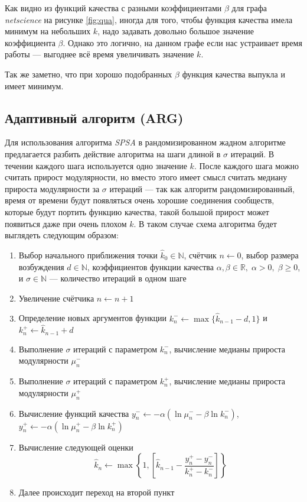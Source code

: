 Как видно из функций качества с разными коэффициентами $\beta$ для графа \emph{netscience} на рисунке \ref{fig:qua}, иногда для того, чтобы функция качества имела минимум на небольших $k$, надо задавать довольно большое значение коэффициента $\beta$. Однако это логично, на данном графе если нас устраивает время работы --- выгоднее всё время увеличивать значение $k$.

Так же заметно, что при хорошо подобранных $\beta$ функция качества выпукла и имеет минимум.



\subsection{Адаптивный алгоритм (ARG)}

Для использования алгоритма \emph{SPSA} в рандомизированном жадном алгоритме предлагается разбить действие алгоритма на шаги длиной в $\sigma$ итераций. В течении каждого шага используется одно значение $k$. После каждого шага можно считать прирост модулярности, но вместо этого имеет смысл считать медиану прироста модулярности за $\sigma$ итераций --- так как алгоритм рандомизированный, время от времени будут появляться очень хорошие соединения сообществ, которые будут портить функцию качества, такой большой прирост может появиться даже при очень плохом $k$. В таком случае схема алгоритма будет выглядеть следующим образом:

\begin{enumerate}
	\item Выбор начального приближения точки $\hat{k}_0 \in \mathbb{N}$, счётчик $n \leftarrow 0$, выбор размера возбуждения $d \in \mathbb{N}$, коэффициентов функции качества $\alpha, \beta \in \mathbb{R},\; \alpha > 0,\;\beta \ge 0$, и $\sigma \in \mathbb{N}$ --- количество итераций в одном шаге
	\item Увеличение счётчика $n \leftarrow n + 1$
	\item Определение новых аргументов функции $k_{n}^{-} \leftarrow \max\{\hat{k}_{n - 1} - d, 1\}$ и $k_{n}^{+} \leftarrow \hat{k}_{n - 1} + d$
	\item Выполнение $\sigma$ итераций с параметром $k_{n}^{-}$, вычисление медианы прироста модулярности $\mu_n^{-}$
	\item Выполнение $\sigma$ итераций с параметром $k_{n}^{+}$, вычисление медианы прироста модулярности $\mu_n^{+}$
	\item Вычисление функций качества $y_n^{-} \leftarrow -\alpha (\ln \mu_n^{-} - \beta \ln k_n^{-})$, $y_n^{+} \leftarrow -\alpha (\ln \mu_n^{+} - \beta \ln k_n^{+})$
	\item Вычисление следующей оценки
	\begin{equation} \label{eq:arg-centre}
		\hat{k}_n \leftarrow \max\left\{1, \left[\hat{k}_{n - 1} - \frac{y_n^{+} - y_n^{-}}{k_n^{+} - k_n^{-}}\right]\right\}
	\end{equation}
	\item Далее происходит переход на второй пункт
\end{enumerate}

